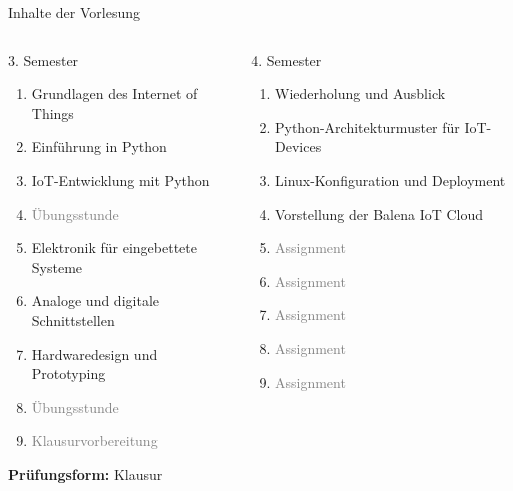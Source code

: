 {
\footnotesize
\begin{frame}{Inhalte der Vorlesung}
        \begin{columns}
            \begin{column}[T]{.5\textwidth}
                \begin{block}{3. Semester}
                    \medskip

                    \begin{enumerate}
                        \item Grundlagen des Internet of Things
                        \item Einführung in Python
                        \item IoT-Entwicklung mit Python
                        \item \textcolor{gray}{Übungsstunde}
                        \item Elektronik für eingebettete Systeme
                        \item Analoge und digitale Schnittstellen
                        \item Hardwaredesign und Prototyping
                        \item \textcolor{gray}{Übungsstunde}
                        \item \textcolor{gray}{Klausurvorbereitung}
                    \end{enumerate}

                    \medskip
                    \textbf{Prüfungsform:} Klausur
                \end{block}
            \end{column}
            \begin{column}[T]{.5\textwidth}
                \begin{block}{4. Semester}
                    \medskip

                    \begin{enumerate}
                        \item Wiederholung und Ausblick
                        \item Python-Architekturmuster für IoT-Devices
                        \item Linux-Konfiguration und Deployment
                        \item Vorstellung der Balena IoT Cloud
                        \item \textcolor{gray}{Assignment}
                        \item \textcolor{gray}{Assignment}
                        \item \textcolor{gray}{Assignment}
                        \item \textcolor{gray}{Assignment}
                        \item \textcolor{gray}{Assignment}
                    \end{enumerate}


\end{block}
\end{column}
\end{columns}
\end{frame}}
